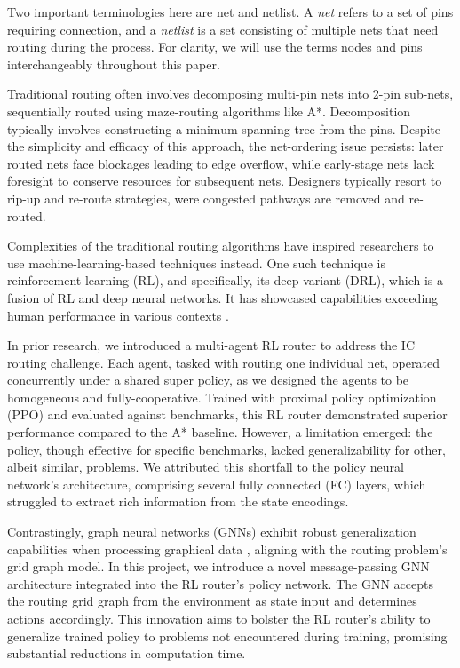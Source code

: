 \documentclass[letterpaper]{article}
\begin{document}
Two important terminologies here are net and netlist. A {\it net} refers to a
set of pins requiring connection, and a {\it netlist} is a set consisting of
multiple nets that need routing during the process. For clarity, we will use the
terms {nodes} and {pins} interchangeably throughout this paper.

Traditional routing often involves decomposing multi-pin nets into 2-pin
sub-nets, sequentially routed using maze-routing algorithms like A*.
Decomposition typically involves constructing a minimum spanning tree from the
pins. Despite the simplicity and efficacy of this approach, the net-ordering
issue persists: later routed nets face blockages leading to edge overflow, while
early-stage nets lack foresight to conserve resources for subsequent nets.
Designers typically resort to rip-up and re-route strategies, were congested
pathways are removed and re-routed.

Complexities of the traditional routing algorithms have inspired researchers to
use machine-learning-based techniques instead. One such technique is
reinforcement learning (RL), and specifically, its deep variant (DRL), which is
a fusion of RL and deep neural networks. It has showcased capabilities exceeding
human performance in various contexts \cite{mnih2013playing}.

In prior research, we introduced a multi-agent RL router to address the IC
routing challenge. Each agent, tasked with routing one individual net, operated
concurrently under a shared super policy, as we designed the agents to be
homogeneous and fully-cooperative. Trained with proximal policy optimization
(PPO) \cite{Schulman2017} and evaluated against benchmarks, this RL router
demonstrated superior performance compared to the A* baseline. However, a
limitation emerged: the policy, though effective for specific benchmarks, lacked
generalizability for other, albeit similar, problems. We attributed this
shortfall to the policy neural network's architecture, comprising several fully
connected (FC) layers, which struggled to extract rich information from the
state encodings.

Contrastingly, graph neural networks (GNNs) exhibit robust generalization
capabilities when processing graphical data \cite{Almasan2022,Wang2018},
aligning with the routing problem’s grid graph model. In this project, we
introduce a novel message-passing GNN architecture integrated into the RL
router’s policy network. The GNN accepts the routing grid graph from the
environment as state input and determines actions accordingly. This innovation
aims to bolster the RL router’s ability to generalize trained policy to problems
not encountered during training, promising substantial reductions in computation
time.
\end{document}
